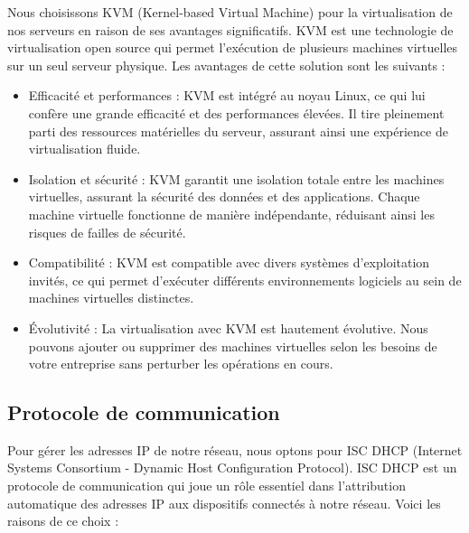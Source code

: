Nous choisissons KVM (Kernel-based Virtual Machine) pour la virtualisation de nos serveurs en raison de ses avantages significatifs. KVM est une technologie de virtualisation open source qui permet l'exécution de plusieurs machines virtuelles sur un seul serveur physique. Les avantages de cette solution sont les suivants :

\begin{itemize}

\item Efficacité et performances : KVM est intégré au noyau Linux, ce qui lui confère une grande efficacité et des performances élevées. Il tire pleinement parti des ressources matérielles du serveur, assurant ainsi une expérience de virtualisation fluide.

\item Isolation et sécurité : KVM garantit une isolation totale entre les machines virtuelles, assurant la sécurité des données et des applications. Chaque machine virtuelle fonctionne de manière indépendante, réduisant ainsi les risques de failles de sécurité.

\item Compatibilité : KVM est compatible avec divers systèmes d'exploitation invités, ce qui permet d'exécuter différents environnements logiciels au sein de machines virtuelles distinctes.

\item Évolutivité : La virtualisation avec KVM est hautement évolutive. Nous pouvons ajouter ou supprimer des machines virtuelles selon les besoins de votre entreprise sans perturber les opérations en cours.

\end{itemize}




\subsection{Protocole de communication}

Pour gérer les adresses IP de notre réseau, nous optons pour ISC DHCP (Internet Systems Consortium - Dynamic Host Configuration Protocol). ISC DHCP est un protocole de communication qui joue un rôle essentiel dans l'attribution automatique des adresses IP aux dispositifs connectés à notre réseau. Voici les raisons de ce choix :

